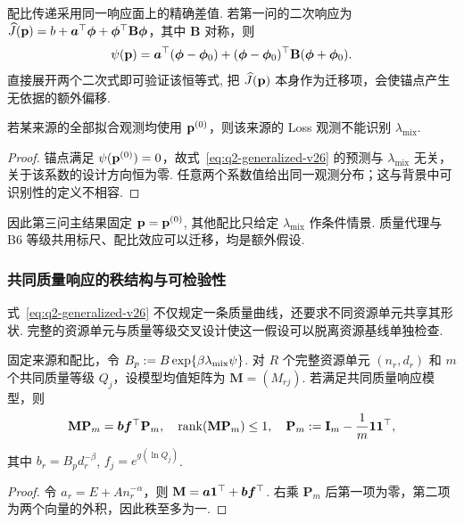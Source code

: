配比传递采用同一响应面上的精确差值. 若第一问的二次响应为 $\widehat J(\mathbf p)=b+\boldsymbol a^\top\boldsymbol\phi+\boldsymbol\phi^\top\mathbf B\boldsymbol\phi$，其中 $\mathbf B$ 对称，则
\begin{equation}\label{eq:q2-exact-mixture}
\psi(\mathbf p)=\boldsymbol a^\top(\boldsymbol\phi-\boldsymbol\phi_0)
+(\boldsymbol\phi-\boldsymbol\phi_0)^\top\mathbf B(\boldsymbol\phi+\boldsymbol\phi_0).
\end{equation}
直接展开两个二次式即可验证该恒等式, 把 $\widehat J(\mathbf p)$ 本身作为迁移项，会使锚点产生无依据的额外偏移. 

\begin{proposition}[锚点数据不能识别配比传递系数]\label{prop:q2-lambda-unidentified-v15}
若某来源的全部拟合观测均使用 $\mathbf p^{(0)}$，则该来源的 Loss 观测不能识别 $\lambda_{\mathrm{mix}}$. 
\end{proposition}
\begin{proof}
锚点满足 $\psi(\mathbf p^{(0)})=0$，故式~\eqref{eq:q2-generalized-v26} 的预测与 $\lambda_{\mathrm{mix}}$ 无关，关于该系数的设计方向恒为零. 任意两个系数值给出同一观测分布；这与背景中可识别性的定义不相容. 
\end{proof}
因此第三问主结果固定 $\mathbf p=\mathbf p^{(0)}$, 其他配比只给定 $\lambda_{\mathrm{mix}}$ 作条件情景. 质量代理与 B6 等级共用标尺、配比效应可以迁移，均是额外假设. 

\subsubsection{共同质量响应的秩结构与可检验性}

式~\eqref{eq:q2-generalized-v26} 不仅规定一条质量曲线，还要求不同资源单元共享其形状. 完整的资源单元与质量等级交叉设计使这一假设可以脱离资源基线单独检查. 

\begin{proposition}[中心化质量响应的秩一必要条件]\label{prop:q2-rank-one-v37}
固定来源和配比，令 $B_p:=B\exp\{\beta\lambda_{\rm mix}\psi\}$. 对 $R$ 个完整资源单元 $(n_r,d_r)$ 和 $m$ 个共同质量等级 $Q_j$，设模型均值矩阵为 $\mathbf M=(M_{rj})$. 若满足共同质量响应模型，则
\begin{equation}\label{eq:q2-rank-one-v37}
\mathbf M\mathbf P_m=\boldsymbol b\boldsymbol f^\top\mathbf P_m,
\quad \operatorname{rank}(\mathbf M\mathbf P_m)\le1,
\quad \mathbf P_m:=\mathbf I_m-\frac1m\mathbf 1\mathbf 1^\top,
\end{equation}
其中 $b_r=B_pd_r^{-\beta}$, $f_j=e^{g(\ln Q_j)}$. 
\end{proposition}
\begin{proof}
令 $a_r=E+An_r^{-\alpha}$，则 $\mathbf M=\boldsymbol a\mathbf 1^\top+\boldsymbol b\boldsymbol f^\top$. 右乘 $\mathbf P_m$ 后第一项为零，第二项为两个向量的外积，因此秩至多为一. 
\end{proof}

